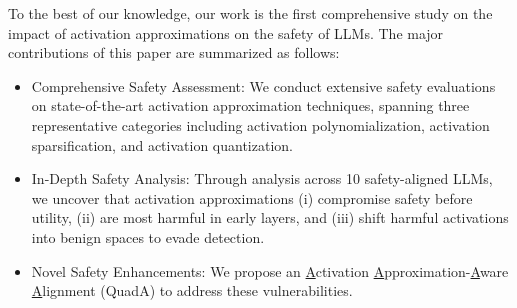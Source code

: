 
 To the best of our knowledge, our work is the first comprehensive study on the impact of activation approximations on the safety of LLMs. The major contributions of this paper are summarized as follows:
\begin{itemize}
    \item Comprehensive Safety Assessment: We conduct extensive safety evaluations on state-of-the-art activation approximation techniques, spanning three representative categories including activation polynomialization, activation sparsification, and activation quantization.
    \item In-Depth Safety Analysis: Through analysis across 10 safety-aligned LLMs, we uncover that activation approximations (i) compromise safety before utility, (ii) are most harmful in early layers, and (iii) shift harmful activations into benign spaces to evade detection.
    \item Novel Safety Enhancements: We propose an \ul{A}ctivation \ul{A}pproximation-\ul{A}ware \ul{A}lignment (QuadA) to address these vulnerabilities. 
\end{itemize}







